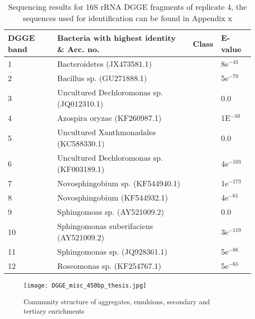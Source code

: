 \documentclass[11pt]{article}
\begin{document}
\begin{sidewaystable}[!htbp]
\begin{tabular}{ | p{1.2cm} | p{10cm} | p{4cm} | p{2cm} | }
\hline
DGGE band & Bacteria with highest identity \& Acc. no. & Class & E-value \\
\hline
1   &  Bacteroidetes (JX473581.1) &  & 8e$^{-45}$ \\
\hline
2  & Bacillus sp. (GU271888.1) & & 5e$^{-70}$ \\
\hline
3 & Uncultured Dechloromonas sp. (JQ012310.1) & & 0.0 \\
\hline
4 & Azospira oryzae (KF260987.1) & & 1E$^{-50}$ \\
\hline
5 & Uncultured Xanthmonadales (KC588330.1) &  & 0.0 \\
\hline
6 & Uncultured Dechloromonas sp. (KF003189.1) & & 4e$^{-103}$ \\
\hline
7 & Novosphingobium sp. (KF544940.1) & & 1e$^{-173}$ \\
\hline
8 & Novosphingobium (KF544932.1) & & 4e$^{-61}$ \\
\hline
9 & Sphingomoas sp. (AY521009.2) & & 0.0 \\
\hline
10 & Sphingomonas suberifaciens (AY521009.2) &  & 3e$^{-119}$ \\
\hline
11 & Sphingomonas sp. (JQ928361.1) &  & 5e$^{-86}$ \\
\hline
12 & Roseomonas sp.  (KF254767.1) & & 5e$^{-65}$ \\
\hline
\end{tabular}
\caption{Sequencing results for 16S rRNA DGGE fragments of replicate 4, the sequences used for identification can be found in Appendix x}
\end{sidewaystable}

\begin{figure}
\texttt{[image: DGGE\_misc\_450bp\_thesis.jpg]}
\caption{Community structure of aggregates, emulsions, secondary and tertiary enrichments}
\end{figure}
\end{document}
